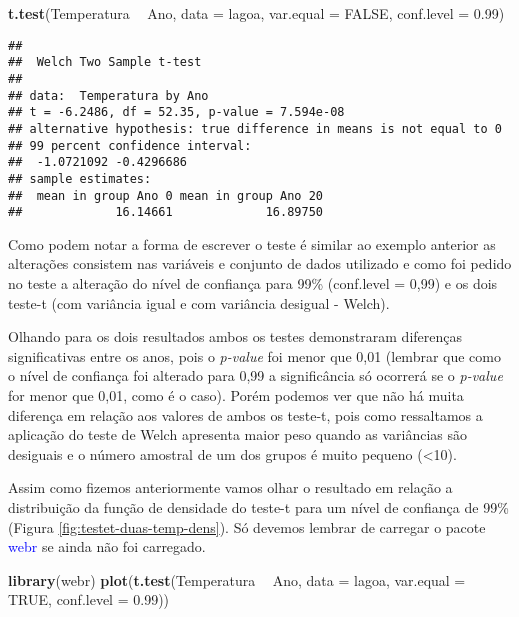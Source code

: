 \documentclass[14pt,titlepage, oneside, openany, a4paper]{book}
\newenvironment{Shaded}{\begin{snugshade}}{\end{snugshade}}
\newcommand{\DataTypeTok}[1]{\textcolor[rgb]{0.13,0.29,0.53}{#1}}
\newcommand{\FloatTok}[1]{\textcolor[rgb]{0.00,0.00,0.81}{#1}}
\newcommand{\KeywordTok}[1]{\textcolor[rgb]{0.13,0.29,0.53}{\textbf{#1}}}
\newcommand{\NormalTok}[1]{#1}
\newcommand{\OperatorTok}[1]{\textcolor[rgb]{0.81,0.36,0.00}{\textbf{#1}}}
\newcommand{\OtherTok}[1]{\textcolor[rgb]{0.56,0.35,0.01}{#1}}
\newcommand{\StringTok}[1]{\textcolor[rgb]{0.31,0.60,0.02}{#1}}
\begin{document}
\begin{Shaded}
\begin{Highlighting}[]
\KeywordTok{t.test}\NormalTok{(Temperatura }\OperatorTok{~}\StringTok{ }\NormalTok{Ano, }
       \DataTypeTok{data =}\NormalTok{ lagoa,}
       \DataTypeTok{var.equal =} \OtherTok{FALSE}\NormalTok{,}
       \DataTypeTok{conf.level =} \FloatTok{0.99}\NormalTok{)}
\end{Highlighting}
\end{Shaded}

\begin{verbatim}
## 
##  Welch Two Sample t-test
## 
## data:  Temperatura by Ano
## t = -6.2486, df = 52.35, p-value = 7.594e-08
## alternative hypothesis: true difference in means is not equal to 0
## 99 percent confidence interval:
##  -1.0721092 -0.4296686
## sample estimates:
##  mean in group Ano 0 mean in group Ano 20 
##             16.14661             16.89750
\end{verbatim}

Como podem notar a forma de escrever o teste é similar ao exemplo anterior as alterações consistem nas variáveis e conjunto de dados utilizado e como foi pedido no teste a alteração do nível de confiança para 99\% (conf.level = 0,99) e os dois teste-t (com variância igual e com variância desigual - Welch).

Olhando para os dois resultados ambos os testes demonstraram diferenças significativas entre os anos, pois o \emph{p-value} foi menor que 0,01 (lembrar que como o nível de confiança foi alterado para 0,99 a significância só ocorrerá se o \emph{p-value} for menor que 0,01, como é o caso). Porém podemos ver que não há muita diferença em relação aos valores de ambos os teste-t, pois como ressaltamos a aplicação do teste de Welch apresenta maior peso quando as variâncias são desiguais e o número amostral de um dos grupos é muito pequeno (\textless{}10).

Assim como fizemos anteriormente vamos olhar o resultado em relação a distribuição da função de densidade do teste-t para um nível de confiança de 99\% (Figura \ref{fig:testet-duas-temp-dens}). Só devemos lembrar de carregar o pacote \textcolor{blue}{webr} se ainda não foi carregado.

\begin{Shaded}
\begin{Highlighting}[]
\KeywordTok{library}\NormalTok{(webr)}
\KeywordTok{plot}\NormalTok{(}\KeywordTok{t.test}\NormalTok{(Temperatura }\OperatorTok{~}\StringTok{ }\NormalTok{Ano, }
            \DataTypeTok{data =}\NormalTok{ lagoa,}
            \DataTypeTok{var.equal =} \OtherTok{TRUE}\NormalTok{,}
            \DataTypeTok{conf.level =} \FloatTok{0.99}\NormalTok{))}
\end{Highlighting}
\end{Shaded}
\end{document}
